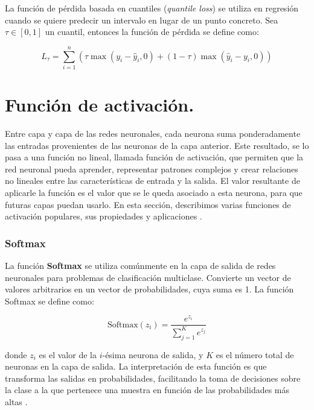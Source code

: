 La función de pérdida basada en cuantiles (\textit{quantile loss}) se utiliza en regresión cuando se quiere predecir un intervalo en lugar de un punto concreto. Sea \(\tau \in [0,1]\) un cuantil, entonces la función de pérdida se define como:

\begin{equation}
    L_{\tau} = \sum_{i=1}^{n} \left(\tau \max(y_i - \hat{y}_i, 0) + (1 - \tau) \max(\hat{y}_i - y_i, 0)\right)
\end{equation}


\section{Función de activación.}

Entre capa y capa de las redes neuronales, cada neurona suma ponderadamente las entradas provenientes de las neuronas de la capa anterior. Este resultado, se lo pasa a una función no lineal, llamada función de activación, que permiten que la red neuronal pueda aprender, representar patrones complejos y crear relaciones no lineales entre las características de entrada y la salida. El valor resultante de aplicarle la función es el valor que se le queda asociado a esta neurona, para que futuras capas puedan usarlo. En esta sección, describimos varias funciones de activación populares, sus propiedades y aplicaciones \citep{pajares2021aprendizaje}.


\subsubsection*{Softmax}


La función \textbf{Softmax} se utiliza comúnmente en la capa de salida de redes neuronales para problemas de clasificación multiclase. Convierte un vector de valores arbitrarios en un vector de probabilidades, cuya suma es 1. La función Softmax se define como:

\begin{equation}
    \text{Softmax}(z_i) = \frac{e^{z_i}}{\sum_{j=1}^{K} e^{z_j}}
\end{equation}

donde \(z_i\) es el valor de la \(i\)-ésima neurona de salida, y \(K\) es el número total de neuronas en la capa de salida. La interpretación de esta función es que transforma las salidas en probabilidades, facilitando la toma de decisiones sobre la clase a la que pertenece una muestra en función de las probabilidades más altas \citep{pajares2021aprendizaje}. 




